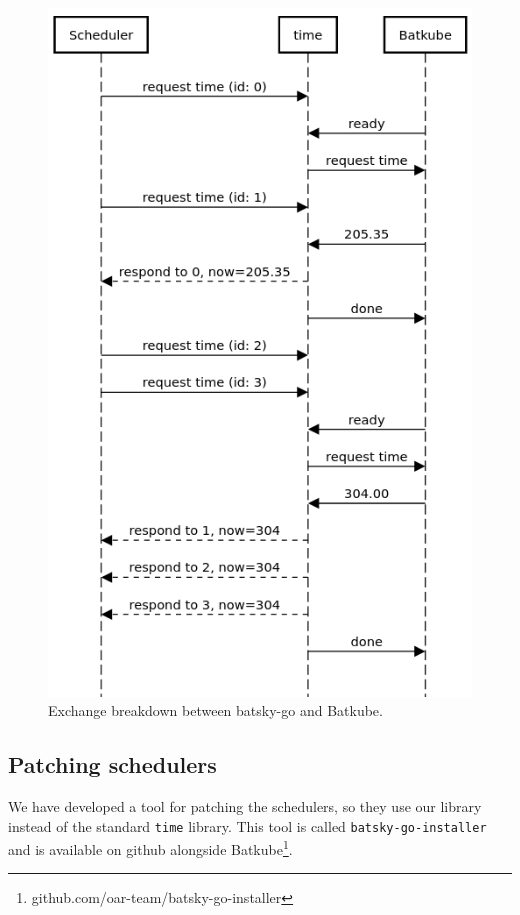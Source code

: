 \begin{figure}[]
	\centering
	\includegraphics[scale=0.43]{imgs/requester_broker_no_CML.png}
	\caption{Exchange breakdown between batsky-go and Batkube.}
	\label{fig:time-interception}
\end{figure}

\subsection{Patching schedulers} \label{sec:patch-scheds}

We have developed a tool for patching the schedulers, so they use our library
instead of the standard \texttt{time} library. This tool is called
\texttt{batsky-go-installer} and is available on github alongside
Batkube\footnote{github.com/oar-team/batsky-go-installer}.

